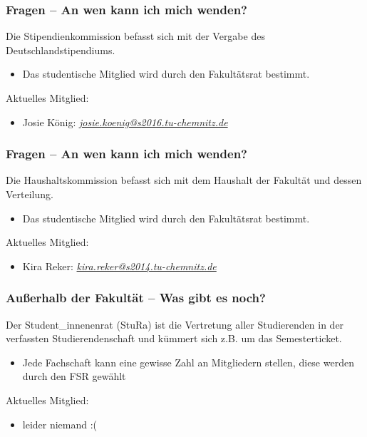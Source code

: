 \documentclass[10pt]{beamer}
\begin{document}
\begin{frame}
	\frametitle{Fragen -- An wen kann ich mich wenden?}
	\begin{block}{\vphantom{X}}
		Die Stipendienkommission befasst sich mit der Vergabe des Deutschlandstipendiums.
	\end{block}
	\begin{itemize}
		\item Das studentische Mitglied wird durch den Fakultätsrat bestimmt.
	\end{itemize}
	Aktuelles Mitglied:
	\begin{itemize}
		\item Josie König: \textit{\href{mailto:josie.koenig@s2016.tu-chemnitz.de}{josie.koenig@s2016.tu-chemnitz.de}}
	\end{itemize}
\end{frame}

\begin{frame}
	\frametitle{Fragen -- An wen kann ich mich wenden?}

	\begin{block}{\vphantom{X}}
		Die Haushaltskommission befasst sich mit dem Haushalt der Fakultät und dessen Verteilung.
	\end{block}

	\begin{itemize}
		\item Das studentische Mitglied wird durch den Fakultätsrat bestimmt.
	\end{itemize}

	Aktuelles Mitglied:

	\begin{itemize}
		\item Kira Reker: \textit{\href{mailto:kira.reker@s2014.tu-chemnitz.de}{kira.reker@s2014.tu-chemnitz.de}}   
	\end{itemize}
\end{frame}

\begin{frame}
	\frametitle{Außerhalb der Fakultät -- Was gibt es noch?}
	
	\begin{block}{\vphantom{X}}
		Der Student\_innenenrat (StuRa) ist die Vertretung aller Studierenden in der verfassten Studierendenschaft und kümmert sich z.B. um das Semesterticket.
	\end{block}

	\begin{itemize}
		\item Jede Fachschaft kann eine gewisse Zahl an Mitgliedern stellen, diese werden durch den FSR gewählt
	\end{itemize}

	Aktuelles Mitglied:

	\begin{itemize}
		\item leider niemand :(
	\end{itemize}
\end{frame}
\end{document}
